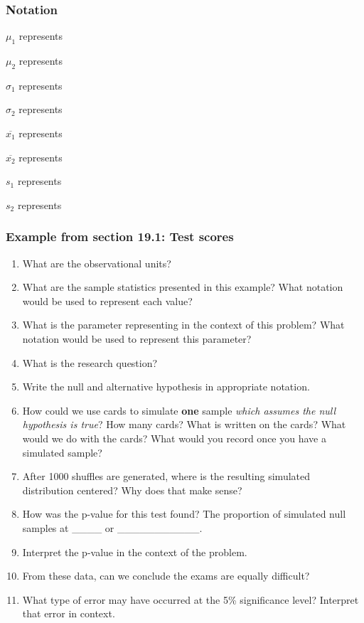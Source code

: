 \documentclass[
]{report}
\newcommand{\rgs}{\vspace{12pt}} %
\begin{document}
\hypertarget{notation-4}{%
\subsubsection*{Notation}\label{notation-4}}

\(\mu_1\) represents
\rgs

\(\mu_2\) represents
\rgs

\(\sigma_1\) represents
\rgs

\(\sigma_2\) represents
\rgs

\(\overline{x_1}\) represents
\rgs

\(\overline{x_2}\) represents
\rgs

\(s_1\) represents
\rgs

\(s_2\) represents
\rgs

\hypertarget{example-from-section-19.1-test-scores}{%
\subsubsection*{Example from section 19.1: Test scores}\label{example-from-section-19.1-test-scores}}

\begin{enumerate}
\def\labelenumi{\arabic{enumi}.}
\item
  What are the observational units?
  \rgs
\item
  What are the sample statistics presented in this example? What notation would be used to represent each value?
  \rgs
\item
  What is the parameter representing in the context of this problem? What notation would be used to represent this parameter?
  \rgs
  \rgs
\item
  What is the research question?
  \rgs
\item
  Write the null and alternative hypothesis in appropriate notation.
  \rgs
\item
  How could we use cards to simulate \textbf{one} sample \emph{which assumes the null hypothesis is true}? How many cards? What is written on the cards? What would we do with the cards? What would you record once you have a simulated sample?
  \rgs
  \rgs
  \rgs
\item
  After 1000 shuffles are generated, where is the resulting simulated distribution centered? Why does that make sense?
  \rgs
  \rgs
\item
  How was the p-value for this test found? The proportion of simulated null samples at \_\_\_\_ or \_\_\_\_\_\_\_\_\_\_\_.
  \rgs
\item
  Interpret the p-value in the context of the problem.
  \rgs
  \rgs
\item
  From these data, can we conclude the exams are equally difficult?
  \rgs
\item
  What type of error may have occurred at the 5\% significance level? Interpret that error in context.
  \rgs
  \rgs
\end{enumerate}
\end{document}
